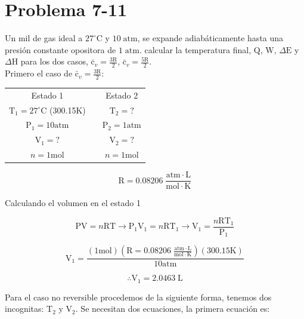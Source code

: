 \documentclass[12pt]{article}
\begin{document}
\section*{Problema 7-11}
Un mil de gas ideal a $27^{\circ}\mathrm{C}$ y $10 \; \mathrm{atm}$, se expande adiabáticamente hasta una presión constante opositora de $1\;\mathrm{atm}$. calcular la temperatura final, $\mathrm{Q}$, $\mathrm{W}$, $\Delta\mathrm{E}$ y $\Delta\mathrm{H}$ para los dos casos, $\mathrm{\bar{c}}_v=\frac{3\mathrm{R}}{2}$, $\mathrm{\bar{c}}_v=\frac{5\mathrm{R}}{2}$.\\

Primero el caso de $\mathrm{\bar{c}}_v=\frac{3\mathrm{R}}{2}$:
\begin{center}
	\begin{tabular}{c c c}
		Estado 1 &   &  Estado 2 \\
		$\mathrm{T}_1=27^{\circ}\mathrm{C}$\; (300.15$\mathrm{K}$) &   & $\mathrm{T}_2=?$ \\
		$\mathrm{P}_1=10\mathrm{atm}$ &   & $\mathrm{P}_2=1\mathrm{atm}$ \\
		$\mathrm{V}_1=?$ &   & $\mathrm{V}_2=?$\\
		$n=1\mathrm{mol}$&   & $n=1\mathrm{mol}$
	\end{tabular}

\begin{displaymath}
	\mathrm{R}=0.08206\; \frac{\mathrm{atm}\cdot\mathrm{L}}{\mathrm{mol}\cdot\mathrm{K}}
\end{displaymath}
\end{center}

Calculando el volumen en el estado 1

\begin{displaymath}
	\mathrm{P}\mathrm{V}=n\mathrm{R}\mathrm{T} \rightarrow \mathrm{P}_1\mathrm{V}_1=n\mathrm{R}\mathrm{T}_1 \rightarrow \mathrm{V}_1=\frac{n\mathrm{R}\mathrm{T}_1}{\mathrm{P}_1}
\end{displaymath}

\begin{displaymath}
	\mathrm{V}_1=\frac{(1\mathrm{mol})(	\mathrm{R}=0.08206\; \frac{\mathrm{atm}\cdot\mathrm{L}}{\mathrm{mol}\cdot\mathrm{K}})(300.15\mathrm{K})}{10\mathrm{atm}}
\end{displaymath}

\begin{displaymath}
	\therefore\mathrm{V}_1=2.0463 \;\mathrm{L}
\end{displaymath}

Para el caso no reversible procedemos de la siguiente forma, tenemos dos incognitas: $\mathrm{T}_2$ y $\mathrm{V}_2$. Se necesitan dos ecuaciones, la primera ecuación es:
\end{document}
